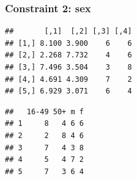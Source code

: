 \subsubsection{Constraint 2: sex}

\begin{Shaded}
\begin{Highlighting}[]
\NormalTok{:}
    \NormalTok{weights2[}\NormalTok{), j] <- all.msim[j, }\NormalTok{]/USd.agg1[j, }\NormalTok{]}
    \NormalTok{weights2[}\NormalTok{), j] <- all.msim[j, }\NormalTok{]/USd.agg1[j, }\NormalTok{]}
\NormalTok{\}}

\NormalTok{:}
\NormalTok{\}}
\end{Highlighting}
\end{Shaded}
\begin{verbatim}
##       [,1]  [,2] [,3] [,4]
## [1,] 8.100 3.900    6    6
## [2,] 2.268 7.732    4    6
## [3,] 7.496 3.504    3    8
## [4,] 4.691 4.309    7    2
## [5,] 6.929 3.071    6    4
\end{verbatim}
\begin{Shaded}
\begin{Highlighting}[]
\end{Highlighting}
\end{Shaded}
\begin{verbatim}
##   16-49 50+ m f
## 1     8   4 6 6
## 2     2   8 4 6
## 3     7   4 3 8
## 4     5   4 7 2
## 5     7   3 6 4
\end{verbatim}
\begin{Shaded}
\begin{Highlighting}[]
\NormalTok{(}\NormalTok{(}\NormalTok{(} \NormalTok{, }
     \NormalTok{)}
\NormalTok{(} \NormalTok{, } \NormalTok{)}
\end{Highlighting}
\end{Shaded}
